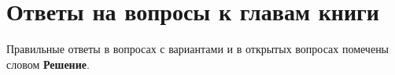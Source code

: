 ﻿\chapter{Ответы на вопросы к главам книги}

Правильные ответы в вопросах с вариантами и в открытых вопросах помечены словом \textbf{Решение}.


% 



% 








